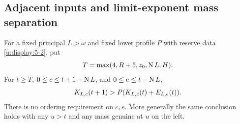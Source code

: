 \subsection{Adjacent inputs and limit-exponent mass separation}
\begin{theorem}\label{u:thm:adjacent}
For a fixed principal $L>\omega$ and fixed lower profile $P$ with reserve
data \eqref{u:display:5-2}, put
\begin{equation}
              T=\max(4,R+5,z_0,\operatorname{N} L,H).            \label{u:display:6-1}
\end{equation}
For $t\ge T$, $0\le c\le t+1-\operatorname{N} L$, and
$0\le e\le t-\operatorname{N} L$,
\begin{equation}
       K_{L,c}(t+1)>P(K_{L,e}(t)+E_{L,e}(t)).            \label{u:display:6-2}
\end{equation}
There is no ordering requirement on $c,e$. More generally the same
conclusion holds with any $u>t$ and any mass genuine at $u$ on the left.
\end{theorem}

